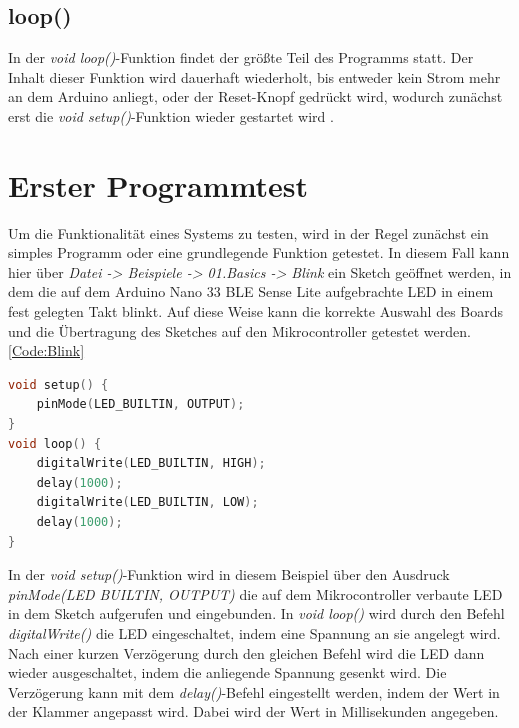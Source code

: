 \subsection{loop()}

In der \textit{void loop()}-Funktion findet der größte Teil des Programms statt. Der Inhalt dieser Funktion wird dauerhaft wiederholt, bis entweder kein Strom mehr an dem Arduino anliegt, oder der Reset-Knopf gedrückt wird, wodurch zunächst erst die \textit{void setup()}-Funktion wieder gestartet wird \cite{ArdIDE.2024e}.

\section{Erster Programmtest}\label{ersterprogrammtest}

Um die Funktionalität eines Systems zu testen, wird in der Regel zunächst ein simples Programm oder eine grundlegende Funktion getestet.
In diesem Fall kann hier über \textit{Datei -> Beispiele -> 01.Basics -> Blink} ein Sketch geöffnet werden, in dem die auf dem Arduino Nano 33 BLE Sense Lite aufgebrachte LED in einem fest gelegten Takt blinkt. Auf diese Weise kann die korrekte Auswahl des Boards und die Übertragung des Sketches auf den Mikrocontroller getestet werden.
\ref{Code:Blink}

\begin{code}[H]
	\begin{lstlisting}[language=c++]
void setup() {
	pinMode(LED_BUILTIN, OUTPUT);
}
void loop() {
	digitalWrite(LED_BUILTIN, HIGH);
	delay(1000);                     
	digitalWrite(LED_BUILTIN, LOW);  
	delay(1000);                     
}
\end{lstlisting}      

\caption[Blink.py]{Blink.py}\label{Code:Blink}    
\end{code} 

In der \textit{void setup()}-Funktion wird in diesem Beispiel über den Ausdruck \textit{pinMode(LED BUILTIN, OUTPUT)} die auf dem Mikrocontroller verbaute LED in dem Sketch aufgerufen und eingebunden.
In \textit{void loop()} wird durch den Befehl\textit{ digitalWrite()} die LED eingeschaltet, indem eine Spannung an sie angelegt wird. Nach einer kurzen Verzögerung durch den gleichen Befehl wird die LED dann wieder ausgeschaltet, indem die anliegende Spannung gesenkt wird. Die Verzögerung kann mit dem \textit{delay()}-Befehl eingestellt werden, indem der Wert in der Klammer angepasst wird. Dabei wird der Wert in Millisekunden angegeben.\cite{Arduino.2014}
